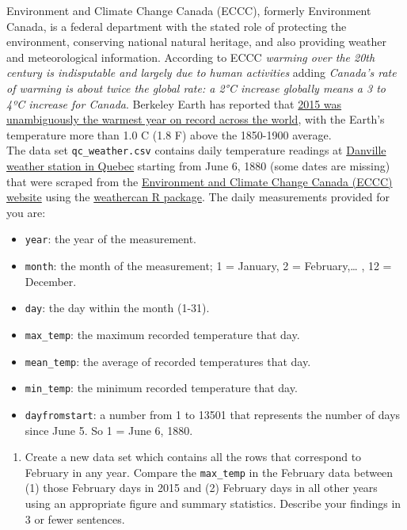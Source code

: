 \documentclass[letterpaper,12pt,twoside,]{pinp}
\providecommand{\tightlist}{%
  \setlength{\itemsep}{0pt}\setlength{\parskip}{0pt}}
\begin{document}
Environment and Climate Change Canada (ECCC), formerly Environment
Canada, is a federal department with the stated role of protecting the
environment, conserving national natural heritage, and also providing
weather and meteorological information. According to ECCC \emph{warming
over the 20th century is indisputable and largely due to human
activities} adding \emph{Canada's rate of warming is about twice the
global rate: a 2°C increase globally means a 3 to 4ºC increase for
Canada}. Berkeley Earth has reported that
\href{http://berkeleyearth.org/wp-content/uploads/2016/01/2015-Hottest-Year-BE-Press-Release-v1.0.pdf}{2015
was unambiguously the warmest year on record across the world}, with the
Earth's temperature more than 1.0 C (1.8 F) above the 1850-1900
average.\\
The data set \texttt{qc\_weather.csv} contains daily temperature
readings at
\href{https://www.wunderground.com/weather/ca/danville}{Danville weather
station in Quebec} starting from June 6, 1880 (some dates are missing)
that were scraped from the
\href{https://climate.weather.gc.ca/historical_data/search_historic_data_e.html}{Environment
and Climate Change Canada (ECCC) website} using the
\href{https://docs.ropensci.org/weathercan/index.html}{weathercan R
package}. The daily measurements provided for you are:

\begin{itemize}
\item
  \texttt{year}: the year of the measurement.
\item
  \texttt{month}: the month of the measurement; 1 = January, 2 =
  February,\ldots{} , 12 = December.
\item
  \texttt{day}: the day within the month (1-31).
\item
  \texttt{max\_temp}: the maximum recorded temperature that day.
\item
  \texttt{mean\_temp}: the average of recorded temperatures that day.
\item
  \texttt{min\_temp}: the minimum recorded temperature that day.
\item
  \texttt{dayfromstart}: a number from 1 to 13501 that represents the
  number of days since June 5. So 1 = June 6, 1880.
\end{itemize}

\begin{enumerate}
\def\labelenumi{\alph{enumi})}
\tightlist
\item
  Create a new data set which contains all the rows that correspond to
  February in any year. Compare the \texttt{max\_temp} in the February
  data between (1) those February days in 2015 and (2) February days in
  all other years using an appropriate figure and summary statistics.
  Describe your findings in 3 or fewer sentences.
\end{enumerate}
\end{document}
